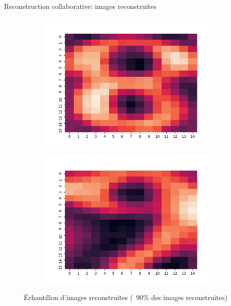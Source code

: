 \documentclass[hyperref={pdfpagelabels=false}]{beamer}
\begin{document}
\begin{frame}{Reconstruction collaborative: images reconstruites}
\begin{figure}[h]
\begin{subfigure}[c]{0.18\textwidth}
                \includegraphics[scale=.12]{8}
            \end{subfigure}
            \begin{subfigure}[c]{0.18\textwidth}
                \includegraphics[scale=.12]{9}
            \end{subfigure}
            \caption{Échantillon d'images reconstruites (~90\% des images 
            reconstruites)}
        \end{figure}
    \end{frame}
\end{document}
